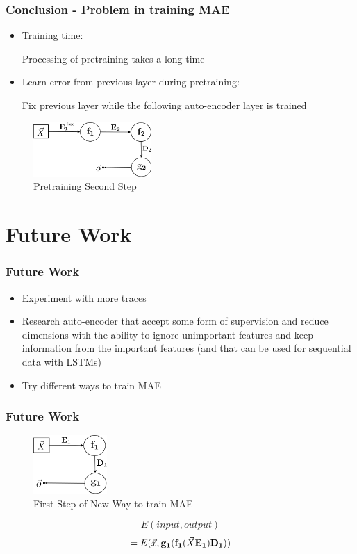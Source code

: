 \documentclass{beamer}
\begin{document}
\begin{frame}
\frametitle{Conclusion - Problem in training MAE}
\begin{itemize}
\item Training time:

Processing of pretraining takes a long time

\item Learn error from previous layer during pretraining:

Fix previous layer while the following auto-encoder layer is trained

\end{itemize}

\begin{figure}[t!]
    \centering
    \includegraphics[width=0.4\textwidth]{../paper/pictures/figures/train_MAE2.png}
    \caption{Pretraining Second Step}
    \label{fig:train_MAE2}
\end{figure}
\end{frame}

\section{Future Work}
\begin{frame}
\frametitle{Future Work}
\begin{itemize}
\item Experiment with more traces
\item Research auto-encoder that accept some form of supervision and reduce dimensions with the ability to ignore unimportant features and keep information from the important features (and that can be used for sequential data with LSTMs)
\item Try different ways to train MAE
\end{itemize}
\end{frame}

\begin{frame}
\frametitle{Future Work}
\begin{figure}[t!]
    \centering
    \includegraphics[width=0.25\textwidth]{../paper/pictures/figures/train_new_MAE1.png}
    \caption{First Step of New Way to train MAE}
    \label{fig:train_NMAE1}
\end{figure}

$$E(input, output)$$
$$=E(\vec{x}, \bold{g_1}(\bold{f_1}(\vec{X}\bold{E_1})\bold{D_1}))$$
\end{frame}
\end{document}
